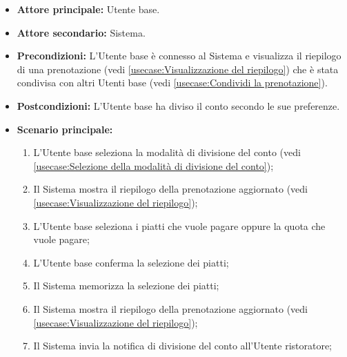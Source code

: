 \label{usecase:Divisione del conto}
\begin{itemize}
	\item \textbf{Attore principale:} Utente base.

	\item \textbf{Attore secondario:} Sistema.

	\item \textbf{Precondizioni:} L'Utente base è connesso al Sistema e
	      visualizza il riepilogo di una prenotazione
	      (vedi \autoref{usecase:Visualizzazione del riepilogo}) che è stata
	      condivisa con altri Utenti base
	      (vedi \autoref{usecase:Condividi la prenotazione}).

	\item \textbf{Postcondizioni:} L'Utente base ha diviso il conto secondo le
	      sue preferenze.

	\item \textbf{Scenario principale:}
	      \begin{enumerate}
		      \item L'Utente base seleziona la modalità di divisione del conto
		            (vedi \autoref{usecase:Selezione della modalità di divisione del conto});

		      \item Il Sistema mostra il riepilogo della prenotazione aggiornato
		            (vedi \autoref{usecase:Visualizzazione del riepilogo});

		      \item L'Utente base seleziona i piatti che vuole pagare oppure la
		            quota che vuole pagare;

		      \item L'Utente base conferma la selezione dei piatti;

		      \item Il Sistema memorizza la selezione dei piatti;

		      \item Il Sistema mostra il riepilogo della prenotazione aggiornato
		            (vedi \autoref{usecase:Visualizzazione del riepilogo});

		      \item Il Sistema invia la notifica di divisione del conto
		            all'Utente ristoratore;
	      \end{enumerate}
\end{itemize}

